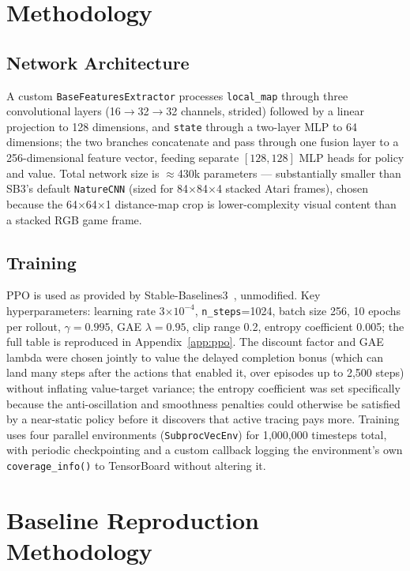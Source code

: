 \documentclass[conference]{IEEEtran}
\begin{document}
\section{Methodology}
\label{sec:method}

\subsection{Network Architecture}

A custom \texttt{BaseFeaturesExtractor} processes \texttt{local\_map} through three convolutional layers (16$\to$32$\to$32 channels, strided) followed by a linear projection to 128 dimensions, and \texttt{state} through a two-layer MLP to 64 dimensions; the two branches concatenate and pass through one fusion layer to a 256-dimensional feature vector, feeding separate $[128,128]$ MLP heads for policy and value. Total network size is $\approx$430k parameters --- substantially smaller than SB3's default \texttt{NatureCNN} (sized for 84$\times$84$\times$4 stacked Atari frames), chosen because the 64$\times$64$\times$1 distance-map crop is lower-complexity visual content than a stacked RGB game frame.

\subsection{Training}

PPO is used as provided by Stable-Baselines3~\cite{raffin2021sb3}, unmodified. Key hyperparameters: learning rate 3$\times10^{-4}$, \texttt{n\_steps}=1024, batch size 256, 10 epochs per rollout, $\gamma=0.995$, GAE $\lambda=0.95$, clip range 0.2, entropy coefficient 0.005; the full table is reproduced in Appendix~\ref{app:ppo}. The discount factor and GAE lambda were chosen jointly to value the delayed completion bonus (which can land many steps after the actions that enabled it, over episodes up to 2{,}500 steps) without inflating value-target variance; the entropy coefficient was set specifically because the anti-oscillation and smoothness penalties could otherwise be satisfied by a near-static policy before it discovers that active tracing pays more. Training uses four parallel environments (\texttt{SubprocVecEnv}) for 1{,}000{,}000 timesteps total, with periodic checkpointing and a custom callback logging the environment's own \texttt{coverage\_info()} to TensorBoard without altering it.

\section{Baseline Reproduction Methodology}
\label{sec:baselines}
\end{document}

